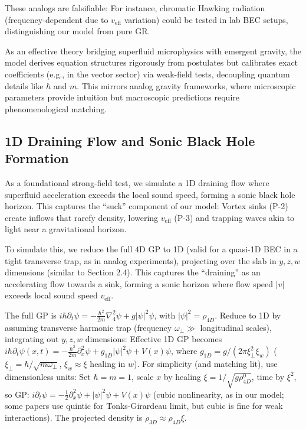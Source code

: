 \documentclass{article}
\begin{document}
These analogs are falsifiable: For instance, chromatic Hawking radiation (frequency-dependent due to $v_{\text{eff}}$ variation) could be tested in lab BEC setups, distinguishing our model from pure GR.

As an effective theory bridging superfluid microphysics with emergent gravity, the model derives equation structures rigorously from postulates but calibrates exact coefficients (e.g., in the vector sector) via weak-field tests, decoupling quantum details like $\hbar$ and $m$. This mirrors analog gravity frameworks, where microscopic parameters provide intuition but macroscopic predictions require phenomenological matching.

\subsection{1D Draining Flow and Sonic Black Hole Formation}

As a foundational strong-field test, we simulate a 1D draining flow where superfluid acceleration exceeds the local sound speed, forming a sonic black hole horizon. This captures the ``suck'' component of our model: Vortex sinks (P-2) create inflows that rarefy density, lowering $v_{\text{eff}}$ (P-3) and trapping waves akin to light near a gravitational horizon.

To simulate this, we reduce the full 4D GP to 1D (valid for a quasi-1D BEC in a tight transverse trap, as in analog experiments), projecting over the slab in $y,z,w$ dimensions (similar to Section 2.4). This captures the ``draining'' as an accelerating flow towards a sink, forming a sonic horizon where flow speed $|v|$ exceeds local sound speed $v_{\text{eff}}$.

The full GP is $i \hbar \partial_t \psi = -\frac{\hbar^2}{2m} \nabla_4^2 \psi + g |\psi|^2 \psi$, with $|\psi|^2 = \rho_{4D}$. Reduce to 1D by assuming transverse harmonic trap (frequency $\omega_\perp \gg$ longitudinal scales), integrating out $y,z,w$ dimensions: Effective 1D GP becomes $i \hbar \partial_t \psi(x,t) = -\frac{\hbar^2}{2m} \partial_x^2 \psi + g_{1D} |\psi|^2 \psi + V(x) \psi$, where $g_{1D} = g / (2\pi \xi_\perp^2 \xi_w)$ ($\xi_\perp = \hbar / \sqrt{m \omega_\perp}$, $\xi_w \approx \xi$ healing in $w$). For simplicity (and matching lit), use dimensionless units: Set $\hbar = m = 1$, scale $x$ by healing $\xi = 1 / \sqrt{g \rho_{4D}^0}$, time by $\xi^2$, so GP: $i \partial_t \psi = -\frac{1}{2} \partial_x^2 \psi + |\psi|^2 \psi + V(x) \psi$ (cubic nonlinearity, as in our model; some papers use quintic for Tonks-Girardeau limit, but cubic is fine for weak interactions). The projected density is $\rho_{3D} \approx \rho_{4D} \xi$.
\end{document}
